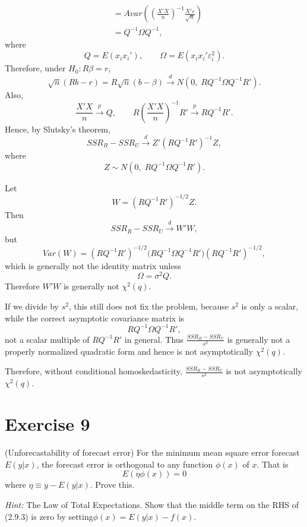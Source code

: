 \documentclass[12pt, letterpaper, onecolumn]{exam}
\begin{document}
\begin{solution}
\begin{align*}
                                             & =Avar\!\left(\left(\frac{X'X}{n}\right)^{-1}\frac{X'\varepsilon}{\sqrt{n}}\right) \\
                                             & =Q^{-1}\Omega Q^{-1},
    \end{align*}
    where
    \[
        Q=E(x_{i}x_{i}'), \qquad \Omega=E(x_{i}x_{i}'\varepsilon_{i}^{2}).
    \]
    Therefore, under $H_{0}:R\beta=r$,
    \[
        \sqrt{n}(Rb-r) =R\sqrt{n}(b-\beta) \xrightarrow{d}N\!\left(0,\;RQ^{-1}
        \Omega Q^{-1}R'\right).
    \]
    Also,
    \[
        \frac{X'X}{n}\xrightarrow{p}Q, \qquad R\left(\frac{X'X}{n}\right)^{-1}
        R'\xrightarrow{p}RQ^{-1}R'.
    \]
    Hence, by Slutsky's theorem,
    \[
        SSR_{R}-SSR_{U}\xrightarrow{d}Z'(RQ^{-1}R')^{-1}Z,
    \]
    where
    \[
        Z\sim N\!\left(0,\;RQ^{-1}\Omega Q^{-1}R'\right).
    \]

    Let
    \[
        W=(RQ^{-1}R')^{-1/2}Z.
    \]
    Then
    \[
        SSR_{R}-SSR_{U}\xrightarrow{d}W'W,
    \]
    but
    \[
        Var(W) =(RQ^{-1}R')^{-1/2}\big(RQ^{-1}\Omega Q^{-1}R'\big) (RQ^{-1}R
        ')^{-1/2},
    \]
    which is generally not the identity matrix unless
    \[
        \Omega=\sigma^{2}Q.
    \]
    Therefore $W'W$ is generally not $\chi^{2}(q)$.

    If we divide by $s^{2}$, this still does not fix the problem, because
    $s^{2}$ is only a scalar, while the correct asymptotic covariance matrix
    is
    \[
        RQ^{-1}\Omega Q^{-1}R',
    \]
    not a scalar multiple of $RQ^{-1}R'$ in general. Thus
    $\frac{SSR_{R}-SSR_{U}}{s^{2}}$ is generally not a properly normalized
    quadratic form and hence is not asymptotically $\chi^{2}(q)$.

    Therefore, without conditional homoskedasticity,
    $\frac{SSR_{R}-SSR_{U}}{s^{2}}$ is not asymptotically $\chi^{2}(q)$.
\end{solution}

\section*{Exercise 9}
 (Unforecastability of forecast error) For the minimum mean square error forecast
$E(y|x)$, the forecast error is orthogonal to any function $\phi(x)$ of $x$.
That is
\[
    E(\eta \phi(x))=0
\]
where $\eta \equiv y - E(y|x)$. Prove this.

\textit{Hint:} The Law of Total Expectations. Show that the middle term on
the RHS of (2.9.3) is zero by setting$\phi(x)=E(y|x)-f(x)$.
\end{document}

